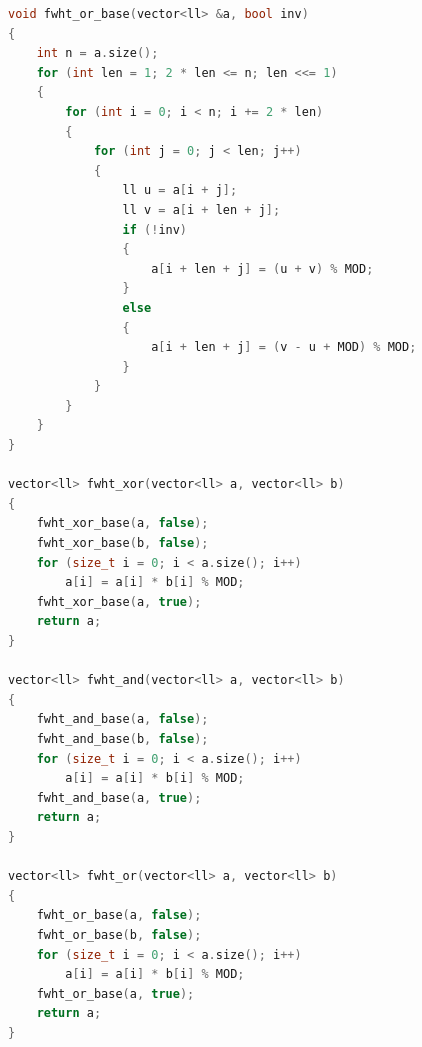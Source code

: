 \documentclass[10pt,landscape,a4paper,twocolumn]{article}
\begin{document}
\begin{lstlisting}[language=C++]
void fwht_or_base(vector<ll> &a, bool inv)
{
    int n = a.size();
    for (int len = 1; 2 * len <= n; len <<= 1)
    {
        for (int i = 0; i < n; i += 2 * len)
        {
            for (int j = 0; j < len; j++)
            {
                ll u = a[i + j];
                ll v = a[i + len + j];
                if (!inv)
                {
                    a[i + len + j] = (u + v) % MOD;
                }
                else
                {
                    a[i + len + j] = (v - u + MOD) % MOD;
                }
            }
        }
    }
}

vector<ll> fwht_xor(vector<ll> a, vector<ll> b)
{
    fwht_xor_base(a, false);
    fwht_xor_base(b, false);
    for (size_t i = 0; i < a.size(); i++)
        a[i] = a[i] * b[i] % MOD;
    fwht_xor_base(a, true);
    return a;
}

vector<ll> fwht_and(vector<ll> a, vector<ll> b)
{
    fwht_and_base(a, false);
    fwht_and_base(b, false);
    for (size_t i = 0; i < a.size(); i++)
        a[i] = a[i] * b[i] % MOD;
    fwht_and_base(a, true);
    return a;
}

vector<ll> fwht_or(vector<ll> a, vector<ll> b)
{
    fwht_or_base(a, false);
    fwht_or_base(b, false);
    for (size_t i = 0; i < a.size(); i++)
        a[i] = a[i] * b[i] % MOD;
    fwht_or_base(a, true);
    return a;
}
\end{lstlisting}
\end{document}
